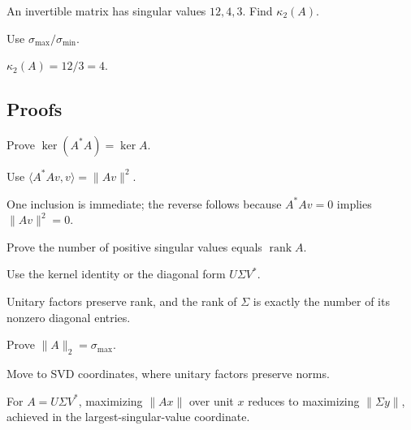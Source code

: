 \begin{exercise}\label{exr:i18-expand-05}
An invertible matrix has singular values \(12,4,3\). Find \(\kappa_2(A)\).
\end{exercise}
\begin{hint}
Use \(\sigma_{\max}/\sigma_{\min}\).
\end{hint}
\begin{solution}
\(\kappa_2(A)=12/3=4\).
\end{solution}

\subsection*{Proofs}

\begin{exercise}\label{exr:i18-expand-06}
Prove \(\ker(A^*A)=\ker A\).
\end{exercise}
\begin{hint}
Use \(\langle A^*Av,v\rangle=\|Av\|^2\).
\end{hint}
\begin{solution}
One inclusion is immediate; the reverse follows because \(A^*Av=0\) implies \(\|Av\|^2=0\).
\end{solution}

\begin{exercise}\label{exr:i18-expand-07}
Prove the number of positive singular values equals \(\operatorname{rank}A\).
\end{exercise}
\begin{hint}
Use the kernel identity or the diagonal form \(U\Sigma V^*\).
\end{hint}
\begin{solution}
Unitary factors preserve rank, and the rank of \(\Sigma\) is exactly the number of its nonzero diagonal entries.
\end{solution}

\begin{exercise}\label{exr:i18-expand-08}
Prove \(\|A\|_2=\sigma_{\max}\).
\end{exercise}
\begin{hint}
Move to SVD coordinates, where unitary factors preserve norms.
\end{hint}
\begin{solution}
For \(A=U\Sigma V^*\), maximizing \(\|Ax\|\) over unit \(x\) reduces to maximizing \(\|\Sigma y\|\), achieved in the largest-singular-value coordinate.
\end{solution}

